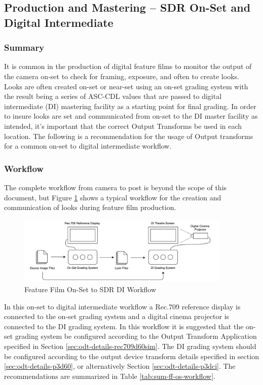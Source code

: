 \subsection{Production and Mastering -- SDR On-Set and Digital Intermediate} \label{subsec:ff-onset-di-sdr}

	\subsubsection{Summary}
	It is common in the production of digital feature films to monitor the output of the camera on-set to check for framing, exposure, and often to create looks.  Looks are often created on-set or near-set using an on-set grading system with the result being a series of ASC-CDL values that are passed to digital intermediate (DI) mastering facility as a starting point for final grading.  In order to insure looks are set and communicated from on-set to the DI master facility as intended, it's important that the correct Output Transforms be used in each location.  The following is a recommendation for the usage of Output transforms for a common on-set to digital intermediate workflow.
	
	\subsubsection{Workflow}
	The complete workflow from camera to post is beyond the scope of this document, but Figure \ref{fig:workflow1} shows a typical workflow for the creation and communication of looks during feature film production.
	
	\begin{figure}[ht!]
	\centering
	    \includegraphics[width=4in]{images/workflows/workflow_ff-sdr-on-set-di.pdf}
	    \caption{\small Feature Film On-Set to SDR DI Workflow}
	    \label{fig:workflow1}
	\end{figure}
	
	In this on-set to digital intermediate workflow a Rec.709 reference display is connected to the on-set grading system and a digital cinema projector is connected to the DI grading system.  In this workflow it is suggested that the on-set grading system be configured according to the Output Transform Application specified in Section \ref{sec:odt-details-rec709d60sim}.  The DI grading system should be configured according to the output device transform details specified in section \ref{sec:odt-details-p3d60}, or alternatively Section \ref{sec:odt-details-p3dci}.  The recommendations are summarized in Table \ref{tab:sum-ff-os-workflow}.
	
